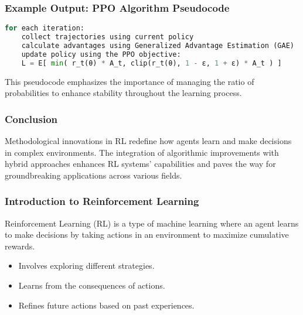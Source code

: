 \documentclass{beamer}
\begin{document}
\begin{frame}[fragile]
    \frametitle{Example Output: PPO Algorithm Pseudocode}
    \begin{lstlisting}[language=Python]
for each iteration:
    collect trajectories using current policy
    calculate advantages using Generalized Advantage Estimation (GAE)
    update policy using the PPO objective:
    L = E[ min( r_t(θ) * A_t, clip(r_t(θ), 1 - ε, 1 + ε) * A_t ) ]
    \end{lstlisting}
    This pseudocode emphasizes the importance of managing the ratio of probabilities to enhance stability throughout the learning process.
\end{frame}

\begin{frame}[fragile]
    \frametitle{Conclusion}
    Methodological innovations in RL redefine how agents learn and make decisions in complex environments. 
    The integration of algorithmic improvements with hybrid approaches enhances RL systems' capabilities and paves the way for groundbreaking applications across various fields.
\end{frame}

\begin{frame}[fragile]
    \frametitle{Introduction to Reinforcement Learning}
    Reinforcement Learning (RL) is a type of machine learning where an agent learns to make decisions by taking actions in an environment to maximize cumulative rewards. 
    \begin{itemize}
        \item Involves exploring different strategies.
        \item Learns from the consequences of actions.
        \item Refines future actions based on past experiences.
    \end{itemize}
\end{frame}
\end{document}
